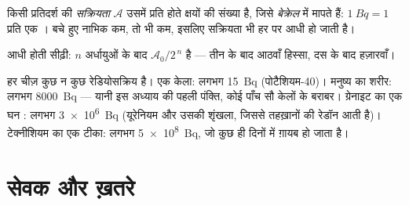 \begin{definition}[सक्रियता]\label{def:g11:nucleus-radioactivity:activity}
किसी प्रतिदर्श की \emph{सक्रियता} $\mathcal A$ उसमें प्रति 
होते क्षयों की संख्या है, जिसे \emph{बेक्रेल} में मापते हैं:
$\qty{1}{Bq} = 1$ प्रति  एक । बचे हुए नाभिक कम, तो  भी कम, इसलिए सक्रियता
भी हर  पर आधी हो जाती है।
\end{definition}

\begin{omfigure}

{\small आधी होती सीढ़ी: $n$ अर्धायुओं के बाद  $\mathcal A_0/2^{\,n}$
है --- तीन के बाद आठवाँ हिस्सा, दस के बाद हज़ारवाँ।}
\end{omfigure}

\begin{example}[परिमाण की कोटियाँ]\label{ex:g11:nucleus-radioactivity:orders}
हर चीज़ कुछ न कुछ रेडियोसक्रिय है। एक केला: लगभग \qty{15}{Bq} (पोटैशियम-40)।
मनुष्य का शरीर: लगभग \qty{8000}{Bq} --- यानी इस अध्याय की पहली पंक्ति, कोई पाँच सौ
केलों के बराबर। ग्रेनाइट का एक घन : लगभग \qty{3e6}{Bq} (यूरेनियम और
उसकी शृंखला, जिससे तहख़ानों की रेडॉन आती है)। टेक्नीशियम का एक टीका: लगभग
\qty{5e8}{Bq}, जो कुछ ही दिनों में ग़ायब हो जाता है।
\end{example}

\section{सेवक और ख़तरे}

